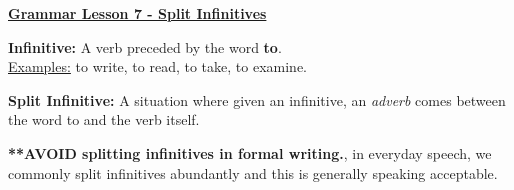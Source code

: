 \documentclass[12pt]{article} %
\begin{document}
	\renewcommand*{\coursecode}{MATH 235} %
	\renewcommand*{\assgnnumber}{Assignment 1} %
	\renewcommand*{\submdate}{September 14, 2021} %
	\renewcommand*{\studentfname}{Abdullah} %
	\renewcommand*{\studentlname}{Zubair} %
    \renewcommand*{\proofname}{Proof:}

	\renewcommand\qedsymbol{$\blacksquare$}
	\setfigpath
	\fancyhfoffset[L,O]{0pt} %





\begin{center}
  \textbf{\underline{\Huge{Grammar Lesson 7 - Split Infinitives}}}
\end{center}

\textbf{Infinitive:} A verb preceded by the word \textbf{to}. \\
\underline{Examples:} to write, to read, to take, to examine.

\textbf{Split Infinitive:} A situation where given an infinitive, an \textit{adverb} comes between the word to and the verb
itself.

\textbf{**AVOID splitting infinitives in formal writing.}, in everyday speech, we commonly split infinitives abundantly and
this is generally speaking acceptable. 
\end{document}

